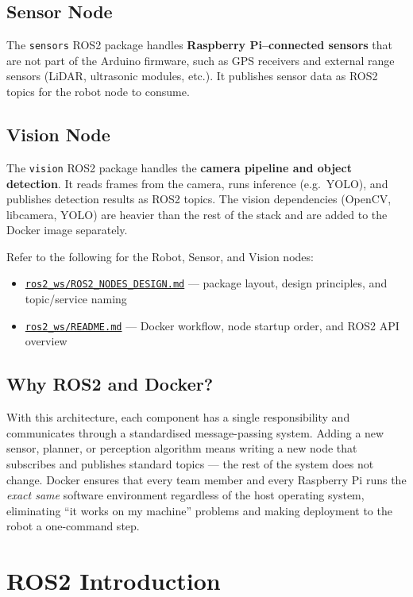 \documentclass{ol-softwaremanual}
\newcommand{\doclink}[2]{\href{#1}{#2}}
\begin{document}
\subsection*{Sensor Node}
The \texttt{sensors} ROS2 package handles \textbf{Raspberry Pi--connected sensors}
that are not part of the Arduino firmware, such as GPS receivers and external range sensors
(LiDAR, ultrasonic modules, etc.).
It publishes sensor data as ROS2 topics for the robot node to consume.

\subsection*{Vision Node}
The \texttt{vision} ROS2 package handles the \textbf{camera pipeline and object detection}.
It reads frames from the camera, runs inference (e.g.\ YOLO), and publishes detection results
as ROS2 topics.
The vision dependencies (OpenCV, libcamera, YOLO) are heavier than the rest of the stack
and are added to the Docker image separately.

Refer to the following for the Robot, Sensor, and Vision nodes:
\begin{itemize}
  \item \doclink{https://github.com/pochihh/Project-NUEVO/blob/main/ros2_ws/ROS2_NODES_DESIGN.md}{\texttt{ros2\_ws/ROS2\_NODES\_DESIGN.md}} --- package layout, design principles, and topic/service naming
  \item \doclink{https://github.com/pochihh/Project-NUEVO/blob/main/ros2_ws/README.md}{\texttt{ros2\_ws/README.md}} --- Docker workflow, node startup order, and ROS2 API overview
\end{itemize}

\subsection*{Why ROS2 and Docker?}
With this architecture, each component has a single responsibility and communicates
through a standardised message-passing system.
Adding a new sensor, planner, or perception algorithm means writing a new node
that subscribes and publishes standard topics --- the rest of the system does not change.
Docker ensures that every team member and every Raspberry Pi runs the \emph{exact same}
software environment regardless of the host operating system, eliminating
``it works on my machine'' problems and making deployment to the robot a one-command step.


\section{ROS2 Introduction}
\end{document}
